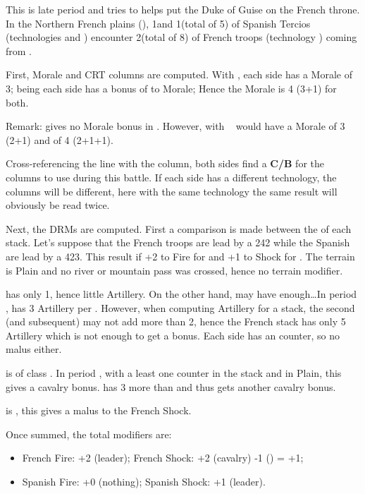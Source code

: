 \begin{exemple}
  This is late period  and \HIS tries to helps 
  put the Duke of Guise on the French throne. In the Northern French plains
  (\provinceArtois), 1\ARMY\faceplus and 1\LD (total of 5\LD) of
   Spanish Tercios (technologies \TMUS and \TTER) encounter
  2\ARMY\faceplus (total of 8\LD) of  French troops (technology
  \TMUS) coming from .

  First, Morale and CRT columns are computed. With \TMUS, each side has a
  Morale of 3; being  each side has a bonus of  to
  Morale; Hence the Morale is 4 (3+1) for both.

  Remark: \TTER gives no Morale bonus in \TMUS. However, with \TARQ\ \FRA
  would have a Morale of 3 (2+1) and \HIS of 4 (2+1+1).

  Cross-referencing the \TMUS line with the \TMUS column, both sides find a
  \textbf{C/B} for the columns to use during this battle. If each side has a
  different technology, the columns will be different, here with the same
  technology the same result will obviously be read twice.

  Next, the DRMs are computed. First a comparison is made between the \LeaderG
  of each stack. Let's suppose that the French troops are lead by a 242
  \LeaderG while the Spanish are lead by a 423. This result if +2 to Fire for
  \FRA and +1 to Shock for \HIS. The terrain is Plain and no river or
  mountain pass was crossed, hence no terrain modifier.

  \HIS has only 1\ARMY\Faceplus, hence little Artillery. On the other hand,
  \FRA may have enough\ldots In period , \FRA has 3 Artillery per
  \ARMY\Faceplus. However, when computing Artillery for a stack, the second
  (and subsequent) \ARMY may not add more than 2, hence the French stack has
  only 5 Artillery which is not enough to get a bonus. Each side has an \ARMY
  counter, so no malus either.

  \FRA is of class \CAIV. In period , with a least one \ARMY
  counter in the stack and in Plain, this gives a  cavalry
  bonus. \FRA has 3 more \LD than \HIS and thus gets another 
  cavalry bonus.

  \HIS is \TTER, this gives a  malus to the French Shock.

  Once summed, the total modifiers are:
  \begin{itemize}
  \item French Fire: +2 (leader); \quad French Shock: +2 (cavalry) -1 (\TTER)
    = +1;
  \item Spanish Fire: +0 (nothing); \quad Spanish Shock: +1 (leader).
  \end{itemize}


\end{exemple}
